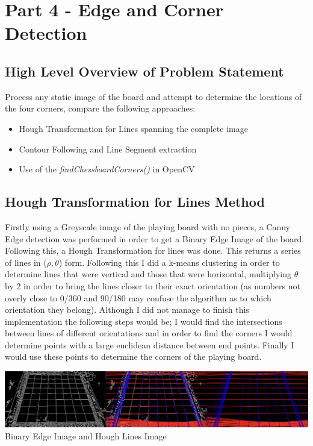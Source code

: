 \documentclass[11pt]{article}
\begin{document}
    \newpage
    \section{Part 4 - Edge and Corner Detection}

    \subsection{High Level Overview of Problem Statement}
    \par
    Process any static image of the board and attempt to determine the locations of the four corners, compare the following approaches:
    \begin{itemize}
        \item Hough Transformation for Lines spanning the complete image
        \item Contour Following and Line Segment extraction
        \item Use of the \emph{findChessboardCorners()} in OpenCV
    \end{itemize}
    \subsection{Hough Transformation for Lines Method}
    \par
    Firstly using a Greyscale image of the playing board with no pieces, a Canny Edge detection was performed in order to get a Binary Edge Image of the board. Following this, a Hough Transformation for lines was done. This returns a series of lines in (\(\rho,\theta\)) form.
    Following this I did a k-means clustering in order to determine lines that were vertical and those that were horizontal, multiplying \(\theta\) by 2 in order to bring the lines closer to their exact orientation (as numbers not overly close to 0/360 and 90/180 may confuse the algorithm
    as to which orientation they belong). Although I did not manage to finish this implementation the following steps would be; I would find the intersections between lines of different orientations and in order to find the corners I would determine points with a large euclidean 
    distance between end points. Finally I would use these points to determine the corners of the playing board.
    \begin{center}
        \includegraphics[scale=0.3]{HoughLines.png}
        Binary Edge Image and Hough Lines Image
    \end{center}
    
\end{document}
